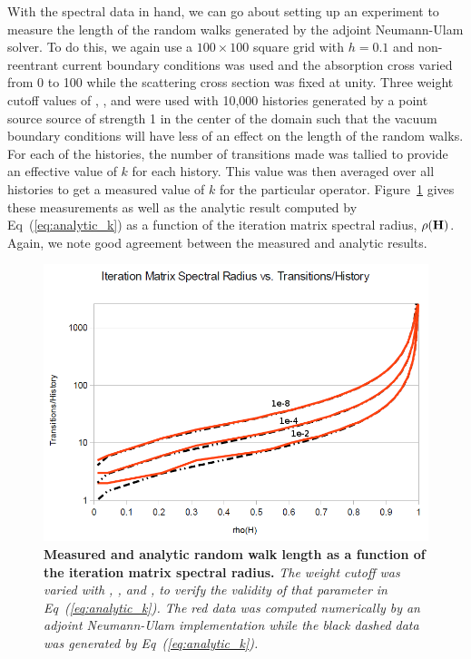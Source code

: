 \documentclass{mc2013}
\begin{document}
With the spectral data in hand, we can go about setting up an
experiment to measure the length of the random walks generated by the
adjoint Neumann-Ulam solver. To do this, we again use a $100 \times
100$ square grid with $h=0.1$ and non-reentrant current boundary
conditions was used and the absorption cross varied from 0 to 100
while the scattering cross section was fixed at unity. Three weight
cutoff values of , , and  were used with
10,000 histories generated by a point source source of strength 1 in
the center of the domain such that the vacuum boundary conditions will
have less of an effect on the length of the random walks. For each of
the histories, the number of transitions made was tallied to provide
an effective value of $k$ for each history. This value was then
averaged over all histories to get a measured value of $k$ for the
particular operator. Figure~\ref{fig:measured_length} gives these
measurements as well as the analytic result computed by
Eq~(\ref{eq:analytic_k}) as a function of the iteration matrix
spectral radius, $\rho(\mathbf{H})$. Again, we note good agreement between
the measured and analytic results.
\vspace{16pt}
\begin{figure}[ht!]
\begin{spacing}{1.0}
  \begin{center}
    \includegraphics[width=5in,clip]{measured_length.png}
  \end{center}
  \caption{\textbf{Measured and analytic random walk length as a
      function of the iteration matrix spectral radius.} \textit{The
      weight cutoff was varied with , , and
      , to verify the validity of that parameter in
      Eq~(\ref{eq:analytic_k}). The red data was computed numerically
      by an adjoint Neumann-Ulam implementation while the black dashed
      data was generated by Eq~(\ref{eq:analytic_k}).}}
  \label{fig:measured_length}
\end{spacing}
\end{figure}
\vspace{16pt}
\end{document}
